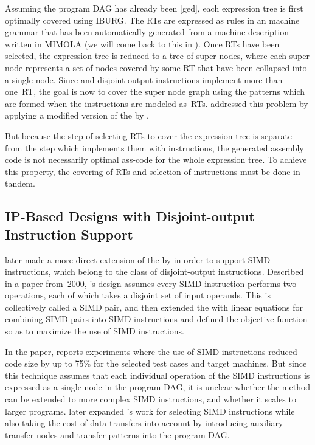Assuming the \gls{program DAG} has already been [ged], each
\gls{expression tree} is first optimally covered using \gls{IBURG}.
%
The \glspl{RT}
are expressed as \glspl{rule} in an \gls{machine grammar} that has been
automatically generated from a \gls{machine description} written in \gls{MIMOLA}
(we will come back to this in
).
%
Once \glspl{RT} have been
selected, the \gls{expression tree} is reduced to a \gls{tree} of \glspl{super
  node}, where each \gls{super node} represents a set of \glspl{node} covered by
some \gls{RT} that have been collapsed into a single \gls{node}.
%
Since
 and \glspl{disjoint-output instruction}
implement more than one~\gls{RT}, the goal is now to cover the \gls{super node}
\gls{graph} using the \glspl{pattern} which are formed when the
\glspl{instruction} are modeled as~\glspl{RT}.
%
\citeauthor{Leupers1996}
addressed this problem by applying a modified version of the \tIPmodel by
\citeauthor{Wilson1994}.

But because the step of selecting \glspl{RT} to cover the \gls{expression tree} is
separate from the step which implements them with \glspl{instruction}, the
generated \gls{assembly code} is not necessarily \gls{optimal ass-code} for the
whole \gls{expression tree}.
%
To achieve this property, the covering of \glspl{RT}
and selection of \glspl{instruction} must be done in tandem.


\subsection{IP-Based Designs with Disjoint-output Instruction Support}

\textcite{Leupers2000b} later made a more direct extension of the \tIPmodel by
\citeauthor{Wilson1994} in order to support \glspl{SIMD instruction}, which
belong to the class of \glspl{disjoint-output instruction}.
%
Described in a paper
from~2000, \citeauthor{Leupers2000b}'s design assumes every \gls{SIMD
  instruction} performs two operations, each of which takes a disjoint set of
input operands.
%
This is collectively called a \gls{SIMD pair}, and
\citeauthor{Leupers2000b} then extended the \tIPmodel with linear equations for
combining \glspl{SIMD pair} into \glspl{SIMD instruction} and defined the
objective function so as to maximize the use of \glspl{SIMD instruction}.

In the paper, \citeauthor{Leupers2000b} reports experiments where the use of
\glspl{SIMD instruction} reduced code size by up to 75\% for the selected test
cases and \glspl{target machine}.
%
But since this technique assumes that each
individual operation of the \glspl{SIMD instruction} is expressed as a single
\gls{node} in the \gls{program DAG}, it is unclear whether the method can be
extended to more complex \glspl{SIMD instruction}, and whether it scales to
larger \glspl{program}.
%
\textcite{Tanaka2003} later expanded
\citeauthor{Leupers2000b}'s work for selecting \glspl{SIMD instruction} while
also taking the cost of data transfers into account by introducing auxiliary
transfer \glspl{node} and transfer \glspl{pattern} into the \gls{program DAG}.


